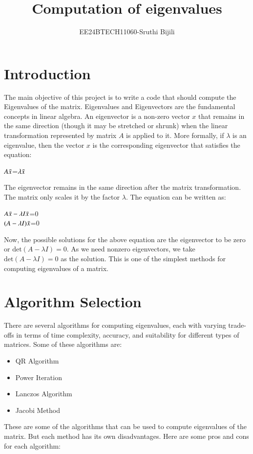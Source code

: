 \documentclass[journal]{IEEEtran}
\begin{document}

\vspace{3cm}

\title{Computation of eigenvalues}
\author{EE24BTECH11060-Sruthi Bijili}
{\let\newpage\relax\maketitle}

\renewcommand{\thefigure}{\theenumi}
\renewcommand{\thetable}{\theenumi}
\setlength{\intextsep}{10pt} %


\renewcommand{\thetable}{\theenumi}
\section*{Introduction}
The main objective of this project is to write a code that should compute the Eigenvalues of the matrix. Eigenvalues and Eigenvectors are the fundamental concepts in linear algebra. An eigenvector is a non-zero vector $x$ that remains in the same direction (though it may be stretched or shrunk) when the linear transformation represented by matrix $A$ is applied to it. More formally, if $\lambda$ is an eigenvalue, then the vector $x$ is the corresponding eigenvector that satisfies the equation:
\begin{center}
    $A\Bar{x}$=$\lambda \Bar{x}$
\end{center}
The eigenvector remains in the same direction after the matrix transformation. The matrix only scales it by the factor $\lambda$. The equation can be written as:
\begin{center}
    $A\Bar{x}-\lambda I\Bar{x}$=$0$\\
    $(A-\lambda I)\Bar{x}$=$0$
\end{center}
Now, the possible solutions for the above equation are the eigenvector to be zero or $\text{det} (A - \lambda I) = 0$. As we need nonzero eigenvectors, we take $\text{det}(A - \lambda I) = 0$ as the solution. This is one of the simplest methods for computing eigenvalues of a matrix.
\section*{Algorithm Selection}
There are several algorithms for computing eigenvalues, each with varying trade-offs in terms of time complexity, accuracy, and suitability for different types of matrices. Some of these algorithms are:
\begin{itemize}
    \item QR Algorithm
    \item Power Iteration
    \item Lanczos Algorithm
    \item Jacobi Method
\end{itemize}
These are some of the algorithms that can be used to compute eigenvalues of the matrix. But each method has its own disadvantages. Here are some pros and cons for each algorithm:
\end{document}
